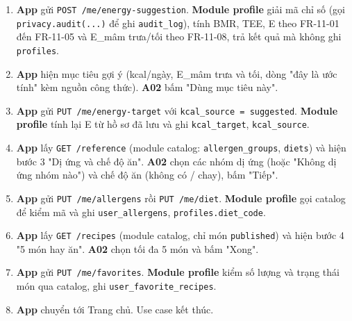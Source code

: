 \begin{enumerate}
\item \textbf{App} gửi {\small\texttt{POST /\allowbreak{}\allowbreak{}me/\allowbreak{}\allowbreak{}energy-\allowbreak{}suggestion}}. \textbf{Module profile} giải mã chỉ số (gọi {\small\texttt{privacy.\allowbreak{}audit(.\allowbreak{}.\allowbreak{}.\allowbreak{})}} để ghi {\small\texttt{audit\_\allowbreak{}\allowbreak{}log}}), tính BMR, TEE, E theo FR-\allowbreak{}11-\allowbreak{}01 đến FR-\allowbreak{}11-\allowbreak{}05 và E\_\allowbreak{}mâm trưa/\allowbreak{}tối theo FR-\allowbreak{}11-\allowbreak{}08, trả kết quả mà không ghi {\small\texttt{profiles}}.
\item \textbf{App} hiện mục tiêu gợi ý (kcal/\allowbreak{}ngày, E\_\allowbreak{}mâm trưa và tối, dòng "đây là ước tính" kèm nguồn công thức). \textbf{A02} bấm "Dùng mục tiêu này".
\item \textbf{App} gửi {\small\texttt{PUT /\allowbreak{}\allowbreak{}me/\allowbreak{}\allowbreak{}energy-\allowbreak{}target}} với {\small\texttt{kcal\_\allowbreak{}\allowbreak{}source = suggested}}. \textbf{Module profile} tính lại E từ hồ sơ đã lưu và ghi {\small\texttt{kcal\_\allowbreak{}\allowbreak{}target}}, {\small\texttt{kcal\_\allowbreak{}\allowbreak{}source}}.
\item \textbf{App} lấy {\small\texttt{GET /\allowbreak{}\allowbreak{}reference}} (module catalog: {\small\texttt{allergen\_\allowbreak{}\allowbreak{}groups}}, {\small\texttt{diets}}) và hiện bước 3 "Dị ứng và chế độ ăn". \textbf{A02} chọn các nhóm dị ứng (hoặc "Không dị ứng nhóm nào") và chế độ ăn (không có /\allowbreak{} chay), bấm "Tiếp".
\item \textbf{App} gửi {\small\texttt{PUT /\allowbreak{}\allowbreak{}me/\allowbreak{}\allowbreak{}allergens}} rồi {\small\texttt{PUT /\allowbreak{}\allowbreak{}me/\allowbreak{}\allowbreak{}diet}}. \textbf{Module profile} gọi catalog để kiểm mã và ghi {\small\texttt{user\_\allowbreak{}\allowbreak{}allergens}}, {\small\texttt{profiles.\allowbreak{}diet\_\allowbreak{}\allowbreak{}code}}.
\item \textbf{App} lấy {\small\texttt{GET /\allowbreak{}\allowbreak{}recipes}} (module catalog, chỉ món {\small\texttt{published}}) và hiện bước 4 "5 món hay ăn". \textbf{A02} chọn tối đa 5 món và bấm "Xong".
\item \textbf{App} gửi {\small\texttt{PUT /\allowbreak{}\allowbreak{}me/\allowbreak{}\allowbreak{}favorites}}. \textbf{Module profile} kiểm số lượng và trạng thái món qua catalog, ghi {\small\texttt{user\_\allowbreak{}\allowbreak{}favorite\_\allowbreak{}\allowbreak{}recipes}}.
\item \textbf{App} chuyển tới Trang chủ. Use case kết thúc.
\end{enumerate}
